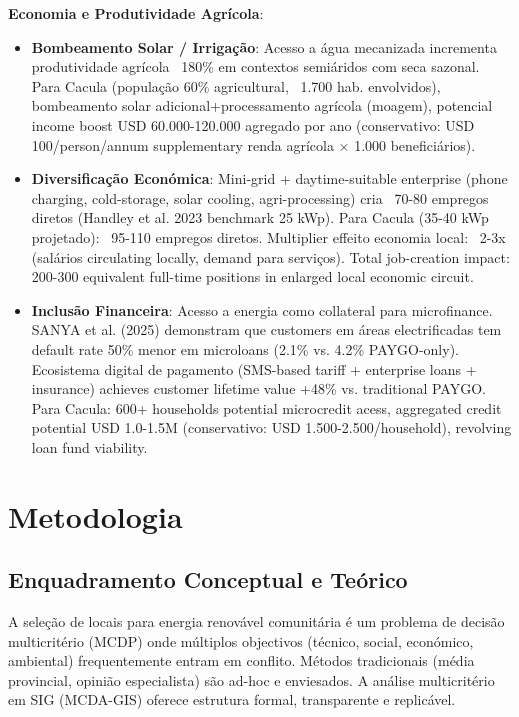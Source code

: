 \documentclass[12pt, a4paper]{article}
\begin{document}
\textbf{Economia e Produtividade Agrícola}:
\begin{itemize}
\item \textbf{Bombeamento Solar / Irrigação}: Acesso a água mecanizada incrementa produtividade agrícola ~180\% em contextos semiáridos com seca sazonal. Para Cacula (população 60\% agricultural, ~1.700 hab. envolvidos), bombeamento solar adicional+processamento agrícola (moagem), potencial income boost USD 60.000-120.000 agregado por ano (conservativo: USD 100/person/annum supplementary renda agrícola × 1.000 beneficiários).
\item \textbf{Diversificação Económica}: Mini-grid + daytime-suitable enterprise (phone charging, cold-storage, solar cooling, agri-processing) cria ~70-80 empregos diretos (Handley et al. 2023 benchmark 25 kWp). Para Cacula (35-40 kWp projetado): ~95-110 empregos diretos. Multiplier effeito economia local: ~2-3x (salários circulating locally, demand para serviços). Total job-creation impact: 200-300 equivalent full-time positions in enlarged local economic circuit.
\item \textbf{Inclusão Financeira}: Acesso a energia como collateral para microfinance. SANYA et al. (2025) demonstram que customers em áreas electrificadas tem default rate 50\% menor em microloans (2.1\% vs. 4.2\% PAYGO-only). Ecosistema digital de pagamento (SMS-based tariff + enterprise loans + insurance) achieves customer lifetime value +48\% vs. traditional PAYGO. Para Cacula: 600+ households potential microcredit acess, aggregated credit potential USD 1.0-1.5M (conservativo: USD 1.500-2.500/household), revolving loan fund viability.
\end{itemize}

\section{Metodologia}

\subsection{Enquadramento Conceptual e Teórico}
A seleção de locais para energia renovável comunitária é um problema de decisão multicritério (MCDP) onde múltiplos objectivos (técnico, social, económico, ambiental) frequentemente entram em conflito. Métodos tradicionais (média provincial, opinião especialista) são ad-hoc e enviesados. A análise multicritério em SIG (MCDA-GIS) oferece estrutura formal, transparente e replicável.
\end{document}
